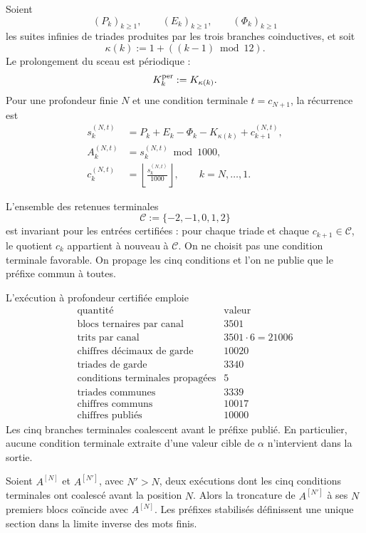 Soient
\[
 (P_k)_{k\geq1},
 \qquad
 (E_k)_{k\geq1},
 \qquad
 (\Phi_k)_{k\geq1}
\]
les suites infinies de triades produites par les trois branches
coinductives, et soit
\[
 \kappa(k):=1+((k-1)\bmod12).
\]
Le prolongement du sceau est périodique :
\[
 K_k^{\rm per}:=K_{\kappa(k)}.
\]
Pour une profondeur finie \(N\) et une condition terminale
\(t=c_{N+1}\), la récurrence est
\begin{equation}
\begin{aligned}
 s_k^{(N,t)}
 &=P_k+E_k-\Phi_k-K_{\kappa(k)}+c_{k+1}^{(N,t)},\\
 A_k^{(N,t)}
 &=s_k^{(N,t)}\bmod1000,\\
 c_k^{(N,t)}
 &=\left\lfloor\frac{s_k^{(N,t)}}{1000}\right\rfloor,
 \qquad k=N,\ldots,1.
\end{aligned}
\label{p3-83-c25-s5:eq:recurrencia-larga-alpha}
\end{equation}

L’ensemble des retenues terminales
\[
 \mathcal C:=\{-2,-1,0,1,2\}
\]
est invariant pour les entrées certifiées : pour chaque triade et chaque
\(c_{k+1}\in\mathcal C\), le quotient \(c_k\) appartient à nouveau à
\(\mathcal C\). On ne choisit pas une condition terminale favorable. On propage
les cinq conditions et l’on ne publie que le préfixe commun à toutes.

L’exécution à profondeur certifiée emploie
\[
\begin{array}{c|r}
\text{quantité}&\text{valeur}\\ \hline
\text{blocs ternaires par canal}&3501\\
\text{trits par canal}&3501\cdot6=21006\\
\text{chiffres décimaux de garde}&10020\\
\text{triades de garde}&3340\\
\text{conditions terminales propagées}&5\\
\text{triades communes}&3339\\
\text{chiffres communs}&10017\\
\text{chiffres publiés}&10000
\end{array}
\]
Les cinq branches terminales coalescent avant le préfixe publié. En
particulier, aucune condition terminale extraite d’une valeur cible de
\(\alpha\) n’intervient dans la sortie.

\begin{theorem}
\label{p3-83-c25-s5:thm:compatibilidad-prolongacion-alpha}
Soient \(A^{[N]}\) et \(A^{[N']}\), avec \(N'>N\), deux exécutions dont les
cinq conditions terminales ont coalescé avant la position \(N\).
Alors la troncature de \(A^{[N']}\) à ses \(N\) premiers blocs
coïncide avec \(A^{[N]}\). Les préfixes stabilisés définissent une unique
section dans la limite inverse des mots finis.
\end{theorem}


